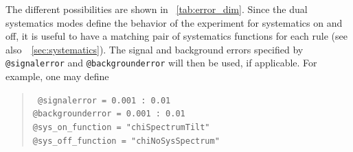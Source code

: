 The different  possibilities are shown in
\Tab~\ref{tab:error_dim}. Since the dual systematics modes define the behavior
of the experiment for systematics on and off, it is useful to have a matching pair of 
systematics functions for each rule 
(see also~\Sec~\ref{sec:systematics}). The signal and background errors specified
by {\tt @signalerror} and  {\tt @backgrounderror} will then be used, if applicable.
For example, one may define 
\begin{quote}
{\tt
\tb @signalerror =       0.001  :       0.01\\
\tb @backgrounderror =   0.001 :       0.01 \\
\tb @sys\_on\_function = "chiSpectrumTilt"  \\
\tb @sys\_off\_function = "chiNoSysSpectrum"  
}
\end{quote}

